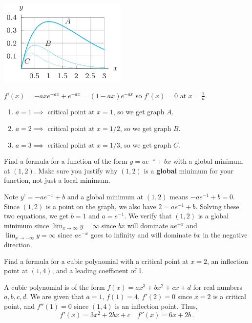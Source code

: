 \documentclass[11pt]{exam}
\begin{document}
\begin{questions}
\includegraphics[width=2.5in]{Figures/graph.png} 
\begin{solution}
  \(f’(x) = -axe^{-ax} + e^{-ax} = (1-ax)e^{-ax}\) so \(f’(x) = 0\) at
  \(x = \frac{1}{a}\).
  \begin{enumerate}
  \item \(a=1 \implies\) critical point at \(x=1\), so we get graph \(A\).
  \item \(a=2 \implies\) critical point at \(x=1/2\), so we get graph \(B\).
  \item \(a=3 \implies\) critical point at \(x=1/3\), so we get graph \(C\).
  \end{enumerate}
\end{solution}
   \question  Find a formula for a function of the form $y=ae^{-x} + bx$ with a global minimum at $(1,2)$.  Make sure you justify why $(1,2)$ is a \textbf{global} minimum for your function, not just a local minimum.
     \begin{solution}
       Note \(y’ = -ae^{-x}+b\) and a global minimum at \((1,2)\)
       means \(-ae^{-1}+b = 0\). Since \((1,2)\) is a point on the
       graph, we also have \(2 = ae^{-1}+b\). Solving these two
       equations, we get \(b = 1\) and \(a=e^{-1}\).
       We verify that \((1,2)\) is a global minimum since \(\lim_{x
         \to \infty} y = \infty\) since \(bx\) will dominate
       \(ae^{-x}\) and \(\lim_{x \to -\infty} y = \infty\) since
       \(ae^{-x}\) goes to infinity and will dominate \(bx\) in the
       negative direction.
     \end{solution}
\vspace{1in}
  \question  Find a formula for a cubic polynomial with a critical point at $x=2$, an inflection point at $(1,4)$, and a leading coefficient of 1. 
    \begin{solution}
      A cubic polynomial is of the form \(f(x) = ax^3+bx^2+cx+d\) for
      real numbers \(a,b,c,d\).
      We are given that \(a=1\), \(f(1) = 4\), \(f'(2) = 0\) since \(x=2\) is a
      critical point, and \(f''(1) = 0\) since \((1,4)\) is an
      inflection point. Thus,
      \[
        f'(x) = 3x^2+2bx+c \quad f''(x) = 6x + 2b \,.
\]
\end{solution}
\end{questions}
\end{document}
